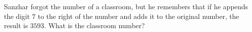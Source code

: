 Sanzhar forgot the number of a classroom, but he remembers that if he appends the digit $7$ to the right of the number and adds it to the original number, the result is $3593$. What is the classroom number?
